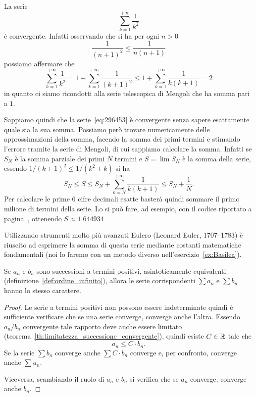 \begin{example}\label{ex:52573}
\mymark{***}
La serie
\begin{equation}\label{eq:296453}
 \sum_{k=1}^{+\infty} \frac{1}{k^2}
\end{equation}
è convergente.
Infatti osservando che si ha per ogni $n>0$
\[
  \frac{1}{(n+1)^2} \le \frac{1}{n(n+1)}
\]
possiamo affermare che
\[
  \sum_{k=1}^{+\infty} \frac{1}{k^2}
  = 1 + \sum_{k=1}^{+\infty} \frac{1}{(k+1)^2}
  \le 1+ \sum_{k=1}^{+\infty} \frac{1}{k(k+1)}
  = 2
\]
in quanto ci siamo ricondotti alla
serie telescopica di Mengoli che ha somma pari a $1$.

Sappiamo quindi che la serie~\eqref{eq:296453} è convergente
senza sapere esattamente quale sia la sua somma.
Possiamo però trovare numericamente delle approssimazioni
della somma, facendo la somma dei primi termini
e stimando l'errore tramite la serie di Mengoli,
di cui sappiamo calcolare la somma.
Infatti se $S_N$ è la somma parziale dei primi
$N$ termini e $S = \lim S_N$ è la somma della serie,
essendo $1/(k+1)^2 \le 1/(k^2+k)$ si ha
\[
S_N
\le S
\le S_N + \sum_{k=N}^{+\infty} \frac{1}{k(k+1)}
\le S_N + \frac{1}{N}.
\]
Per calcolare le prime 6 cifre decimali esatte basterà
quindi sommare il primo milione di termini della serie.
Lo si può fare, ad esempio, con il codice riportato
a pagina~\pageref{code:series}, ottenendo $S\approx 1.644934$

Utilizzando strumenti molto più avanzati
Eulero 
(Leonard Euler, 1707--1783) è
riuscito ad esprimere la somma di questa serie mediante costanti matematiche fondamentali
(noi lo faremo con un metodo diverso nell'esercizio~\ref{ex:Basilea}).
\end{example}

\begin{corollary}
\mymark{*}
Se $a_n$ e $b_n$ sono successioni a termini positivi,
asintoticamente equivalenti (definizione~\ref{def:ordine_infinito}),
allora le serie corrispondenti $\sum a_n$ e $\sum b_n$
hanno lo stesso carattere.
\end{corollary}
%
\begin{proof}
\mymark{*}
Le serie a termini positivi non possono essere indeterminate
quindi è sufficiente verificare che se una serie converge, converge anche l'altra.
Essendo $a_n / b_n$ convergente tale rapporto deve anche essere
limitato (teorema~\ref{th:limitatezza_successione_convergente}), 
quindi esiste $C\in {\mathbb R}$ tale che
\[
   a_n \le C \cdot b_n.
\]
Se la serie $\sum b_n$ converge anche $\sum C \cdot b_n$ converge e, per confronto,
converge anche $\sum a_n$.

Viceversa, scambiando il ruolo di $a_n$ e $b_n$ si verifica che se $a_n$
converge, converge anche $b_n$.
\end{proof}

